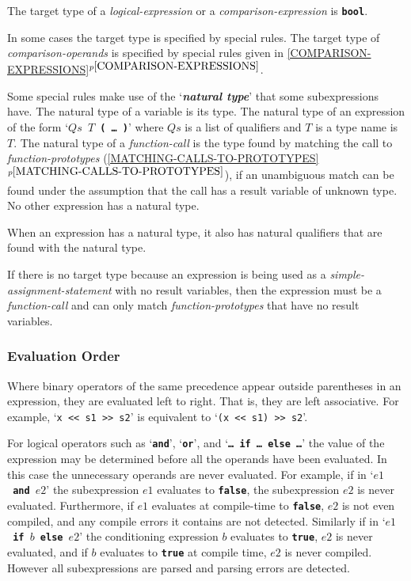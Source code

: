\documentclass[12pt]{article}
\newcommand{\TT}[1]{{\tt \bfseries #1}}
\newcommand{\key}[1]{{\bf \em #1}\index{#1}}
\newcommand{\itemref}[1]{\ref{#1}$^{p\pageref{#1}}$}
\begin{document}
The target type of a {\em logical-expression} or a {\em comparison-expression}
is \TT{bool}.

In some cases the target type is specified by special rules.  The
target type of {\em comparison-operands} is specified by special
rules given in \itemref{COMPARISON-EXPRESSIONS}.

Some special rules
make use of the `\key{natural type}'\label{NATURAL-TYPE}
that some subexpressions have.
The natural type of a variable is its type.
The natural type of an expression of the
form `\TT{$Qs$ $T$ ( \ldots{} )}' where $Qs$ is a list of qualifiers
and $T$ is a type name is $T$.
The natural type of a {\em function-call} is the type found by matching
the call to {\em function-prototypes}
(\itemref{MATCHING-CALLS-TO-PROTOTYPES}), if an unambiguous
match can be found under the assumption that
the call has a result variable of unknown type.
No other expression has a natural type.

When an expression has a natural type, it also has natural qualifiers
that are found with the natural type.

If there is no target type because an expression is being used
as a {\em simple-assignment-statement} with no result variables, then
the expression must be a {\em function-call} and can only match
{\em function-prototypes} that have no result variables.

\subsubsection{Evaluation Order}
\label{EVALUATION-ORDER}

Where binary operators of the same precedence appear outside
parentheses in an expression, they are evaluated left to right.
That is, they are left associative.  For example,
`{\tt x <{}< s1 >{}> s2}' is
equivalent to `{\tt (x <{}< s1) >{}> s2}'.

For logical operators such as `\TT{and}', `\TT{or}', and
`\TT{\ldots{}~if~\ldots{}~else~\ldots{}}' the value of the expression
may be determined before all the operands have been evaluated.
In this case the unnecessary operands are never evaluated.
For example, if in `\TT{$e1$~and~$e2$}' the subexpression $e1$
evaluates to \TT{false}, the subexpression $e2$ is never evaluated.
Furthermore, if $e1$ evaluates at compile-time to \TT{false},
$e2$ is not even compiled, and any compile errors it contains
are not detected.  Similarly if in `\TT{$e1$~if~$b$~else~$e2$}' the
conditioning expression $b$ evaluates to \TT{true}, $e2$ is
never evaluated, and if $b$ evaluates to \TT{true} at compile
time, $e2$ is never compiled.  However all subexpressions are parsed and
parsing errors are detected.
\end{document}
